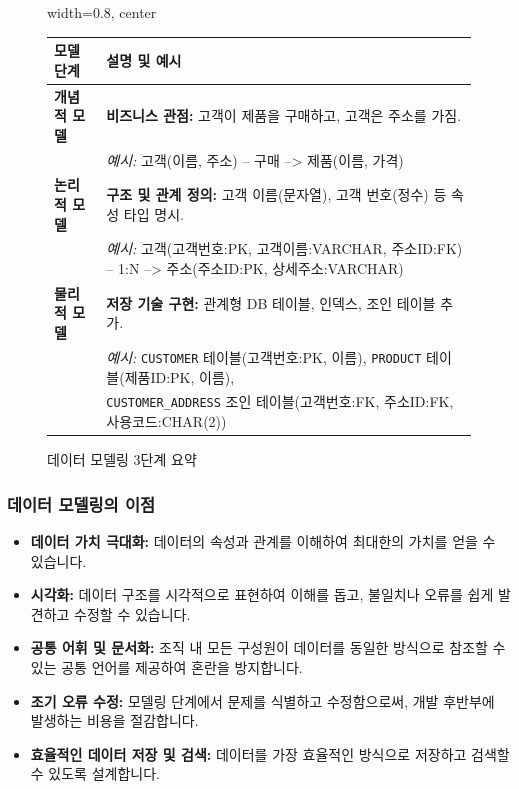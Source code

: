 \documentclass[11pt,a4paper]{article}
\theoremstyle{definition}
\newcommand{\code}[1]{\texttt{#1}}
\begin{document}
\begin{figure}[h!]
\centering
\begin{adjustbox}{width=0.8\textwidth, center}
\begin{tabular}{p{}p{}}
\toprule
\textbf{모델 단계} & \textbf{설명 및 예시} \\
\midrule
\textbf{개념적 모델} & \textbf{비즈니스 관점:} 고객이 제품을 구매하고, 고객은 주소를 가짐. \\
& \textit{예시:} 고객(이름, 주소) -- 구매 --> 제품(이름, 가격) \\
\midrule
\textbf{논리적 모델} & \textbf{구조 및 관계 정의:} 고객 이름(문자열), 고객 번호(정수) 등 속성 타입 명시. \\
& \textit{예시:} 고객(고객번호:PK, 고객이름:VARCHAR, 주소ID:FK) -- 1:N --> 주소(주소ID:PK, 상세주소:VARCHAR) \\
\midrule
\textbf{물리적 모델} & \textbf{저장 기술 구현:} 관계형 DB 테이블, 인덱스, 조인 테이블 추가. \\
& \textit{예시:} \code{CUSTOMER} 테이블(고객번호:PK, 이름), \code{PRODUCT} 테이블(제품ID:PK, 이름), \\
& \code{CUSTOMER_ADDRESS} 조인 테이블(고객번호:FK, 주소ID:FK, 사용코드:CHAR(2)) \\
\bottomrule
\end{tabular}
\end{adjustbox}
\caption{데이터 모델링 3단계 요약}
\label{tab:data_modeling_summary}
\end{figure}

\subsubsection{데이터 모델링의 이점}
\begin{itemize}
    \item \textbf{데이터 가치 극대화:} 데이터의 속성과 관계를 이해하여 최대한의 가치를 얻을 수 있습니다.
    \item \textbf{시각화:} 데이터 구조를 시각적으로 표현하여 이해를 돕고, 불일치나 오류를 쉽게 발견하고 수정할 수 있습니다.
    \item \textbf{공통 어휘 및 문서화:} 조직 내 모든 구성원이 데이터를 동일한 방식으로 참조할 수 있는 공통 언어를 제공하여 혼란을 방지합니다.
    \item \textbf{조기 오류 수정:} 모델링 단계에서 문제를 식별하고 수정함으로써, 개발 후반부에 발생하는 비용을 절감합니다.
    \item \textbf{효율적인 데이터 저장 및 검색:} 데이터를 가장 효율적인 방식으로 저장하고 검색할 수 있도록 설계합니다.
\end{itemize}
\end{document}
